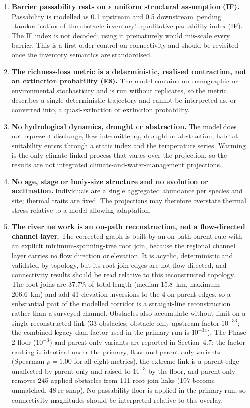 \documentclass[11pt,a4paper]{article}
\begin{document}
\begin{enumerate}
    \item \textbf{Barrier passability rests on a uniform structural assumption (IF).} Passability is modelled as 0.1 upstream and 0.5 downstream, pending standardisation of the obstacle inventory's qualitative passability index (IF). The IF index is not decoded; using it prematurely would mis-scale every barrier. This is a first-order control on connectivity and should be revisited once the inventory semantics are standardised.
    \item \textbf{The richness-loss metric is a deterministic, realised contraction, not an extinction probability (E8).} The model contains no demographic or environmental stochasticity and is run without replicates, so the metric describes a single deterministic trajectory and cannot be interpreted as, or converted into, a quasi-extinction or extinction probability.
    \item \textbf{No hydrological dynamics, drought or abstraction.} The model does not represent discharge, flow intermittency, drought or abstraction; habitat suitability enters through a static index and the temperature series. Warming is the only climate-linked process that varies over the projection, so the results are not integrated climate-and-water-management projections.
    \item \textbf{No age, stage or body-size structure and no evolution or acclimation.} Individuals are a single aggregated abundance per species and site; thermal traits are fixed. The projections may therefore overstate thermal stress relative to a model allowing adaptation.
    \item \textbf{The river network is an on-path reconstruction, not a flow-directed channel layer.} The corrected graph is built by an on-path parent rule with an explicit minimum-spanning-tree root join, because the regional channel layer carries no flow direction or elevation. It is acyclic, deterministic and validated by topology, but its root-join edges are not flow-directed, and connectivity results should be read relative to this reconstructed topology. The root joins are 37.7\% of total length (median 15.8~km, maximum 206.6~km) and add 41 elevation inversions to the 4 on parent edges, so a substantial part of the modelled corridor is a straight-line reconstruction rather than a surveyed channel. Obstacles also accumulate without limit on a single reconstructed link (33 obstacles, obstacle-only upstream factor $10^{-33}$; the combined legacy-dam factor used in the primary run is $10^{-34}$). The Phase 2 floor ($10^{-3}$) and parent-only variants are reported in Section~4.7: the factor ranking is identical under the primary, floor and parent-only variants (Spearman $\rho=1.00$ for all eight metrics), the extreme link is a parent edge unaffected by parent-only and raised to $10^{-3}$ by the floor, and parent-only removes 245 applied obstacles from 111 root-join links (197 become unmatched, 48 re-snap). No passability floor is applied in the primary run, so connectivity magnitudes should be interpreted relative to this overlay.

\end{enumerate}
\end{document}
